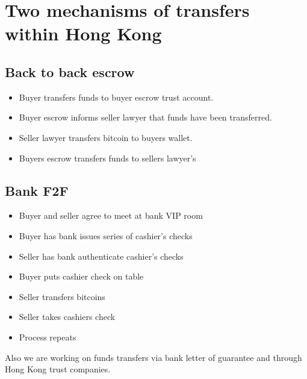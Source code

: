\documentclass[10pt]{article}
\begin{document}
\section{Two mechanisms of transfers within Hong Kong}

\subsection{Back to back escrow}

\begin{itemize}
\item Buyer transfers funds to buyer escrow trust account.
\item Buyer escrow informs seller lawyer that funds have been transferred.
\item Seller lawyer transfers bitcoin to buyers wallet.
\item Buyers escrow transfers funds to sellers lawyer’s
\end{itemize}

\subsection{Bank F2F}

\begin{itemize}
\item Buyer and seller agree to meet at bank VIP room
\item Buyer has bank issues series of cashier’s checks
\item Seller has bank authenticate cashier’s checks
\item Buyer puts cashier check on table
\item Seller transfers bitcoins
\item Seller takes cashiers check
\item Process repeats
\end{itemize}

Also we are working on funds transfers via bank letter of guarantee
and through Hong Kong trust companies.
\end{document}
